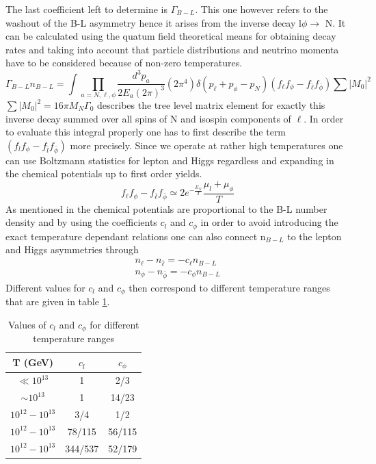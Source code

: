 The last coefficient left to determine is $\Gamma_{B-L}$. This one however refers to the washout of the B-L asymmetry hence it arises from the inverse decay l$\phi\rightarrow$ N. It can be calculated using the quatum field theoretical means for obtaining decay rates and taking into account that particle distributions and neutrino momenta have to be considered because of non-zero temperatures.
\begin{equation}
\Gamma_{B-L}n_{B-L}=\int\prod_{a=N,\ell,\phi}\frac{d^3p_a}{2E_a(2\pi)^3}(2\pi^4)\delta(p_\ell+p_\phi-p_N)(	f_\ell f_\phi-f_{\bar{\ell}}f_{\bar{\phi}})\sum|M_0|^2
\label{eq:Gamma_B-L}
\end{equation}
$\sum|M_0|^2=16\pi M_N\Gamma_0$ describes the tree level matrix element for exactly this inverse decay summed over all spins of N and isospin components of $\ell$. In order to evaluate this integral properly one has to first describe the term $(	f_lf_\phi-f_{\bar{l}}f_{\bar{\phi}})$ more precisely. Since we operate at rather high temperatures one can use Boltzmann statistics for lepton and Higgs regardless and expanding in the chemical potentials up to first order yields.
\begin{equation}
	f_\ell f_\phi-f_{\bar{\ell}}f_{\bar{\phi}}\simeq 2e^{-\frac{E_N}{T}}\frac{\mu_l+\mu_\phi}{T}
	\label{eq:distri_diff}
\end{equation}
As mentioned in \cite[p. 7]{Bodeker:2013qaa} the chemical potentials are proportional to the B-L number density and by using the coefficients $c_l$ and $c_\phi$ in order to avoid introducing the exact temperature dependant relations one can also connect n$_{B-L}$ to the lepton and Higgs asymmetries through \cite[p. 7]{Bodeker:2013qaa}
\begin{align}
	n_\ell-n_{\bar{\ell}}=-c_\ell n_{B-L}
	\label{eq:l-lbar} \\
	n_\phi-n_{\bar{\phi}}=-c_\phi n_{B-L}
	\label{eq:phi-phibar}
\end{align}
Different values for $c_l$ and $c_\phi$ then correspond to different temperature ranges that are given in table \ref{tab:temperatur}\cite[Table 1]{Bodeker:2013qaa}.

	\begin{table}[H]
	\centering
	\begin{tabular}{c|c||c}
	T (GeV)& $c_l$ & $c_\phi$\\
	\hline
	$\ll10^{13}$&1&2/3\\
	$\sim10^{13}$&1&14/23\\
	$10^{12}-10^{13}$&3/4&1/2\\
	$10^{12}-10^{13}$&78/115&56/115\\
	$10^{12}-10^{13}$&344/537&52/179\\
	
	\end{tabular}
	\caption{Values of $c_l$ and $c_\phi$ for different temperature ranges}
	\label{tab:temperatur}
	\end{table}

